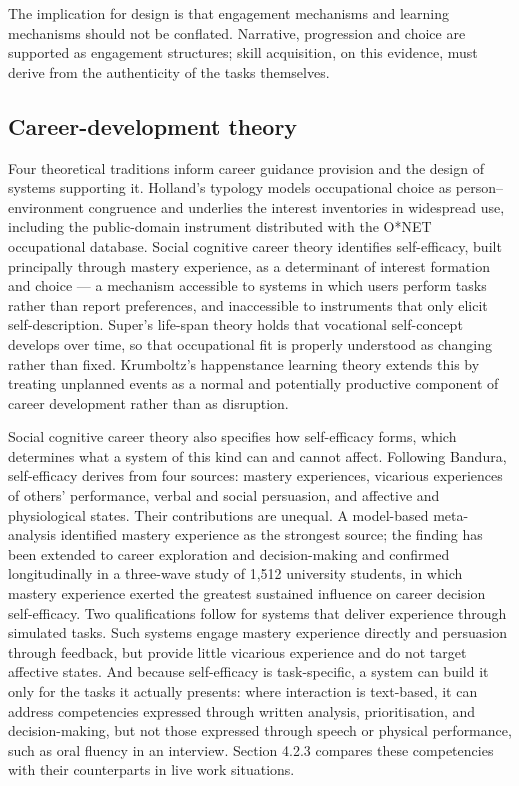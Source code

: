 The implication for design is that engagement mechanisms and learning mechanisms should not be conflated. Narrative, progression and choice are supported as engagement structures; skill acquisition, on this evidence, must derive from the authenticity of the tasks themselves.

\subsection{Career-\allowbreak{}development theory}

Four theoretical traditions inform career guidance provision and the design of systems supporting it. Holland's typology\cite{r41} models occupational choice as person--environment congruence and underlies the interest inventories in widespread use, including the public-\allowbreak{}domain instrument distributed with the O*NET occupational database. Social cognitive career theory\cite{r10,r42} identifies self-\allowbreak{}efficacy, built principally through mastery experience, as a determinant of interest formation and choice --- a mechanism accessible to systems in which users perform tasks rather than report preferences, and inaccessible to instruments that only elicit self-\allowbreak{}description. Super's life-span theory\cite{r43} holds that vocational self-\allowbreak{}concept develops over time, so that occupational fit is properly understood as changing rather than fixed. Krumboltz's happenstance learning theory\cite{r44} extends this by treating unplanned events as a normal and potentially productive component of career development rather than as disruption.

Social cognitive career theory also specifies how self-\allowbreak{}efficacy forms, which determines what a system of this kind can and cannot affect. Following Bandura\cite{r45}, self-\allowbreak{}efficacy derives from four sources: mastery experiences, vicarious experiences of others' performance, verbal and social persuasion, and affective and physiological states. Their contributions are unequal. A model-based meta-\allowbreak{}analysis identified mastery experience as the strongest source\cite{r11}; the finding has been extended to career exploration and decision-\allowbreak{}making\cite{r46} and confirmed longitudinally in a three-wave study of 1,512 university students, in which mastery experience exerted the greatest sustained influence on career decision self-\allowbreak{}efficacy\cite{r47}. Two qualifications follow for systems that deliver experience through simulated tasks. Such systems engage mastery experience directly and persuasion through feedback, but provide little vicarious experience and do not target affective states. And because self-\allowbreak{}efficacy is task-\allowbreak{}specific, a system can build it only for the tasks it actually presents: where interaction is text-based, it can address competencies expressed through written analysis, prioritisation, and decision-\allowbreak{}making, but not those expressed through speech or physical performance, such as oral fluency in an interview. Section 4.2.3 compares these competencies with their counterparts in live work situations.

